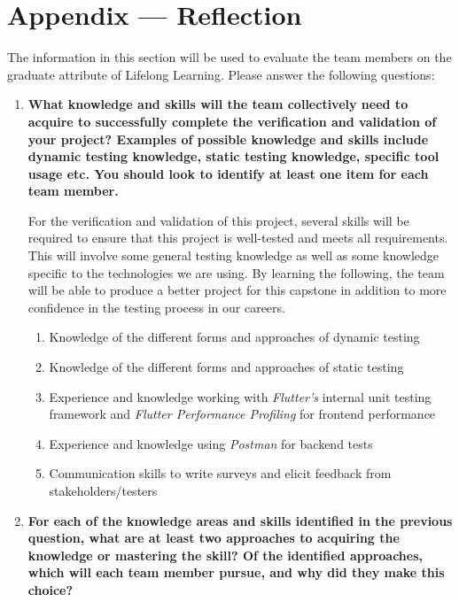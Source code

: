\documentclass[12pt, titlepage]{article}
\begin{document}
\newpage{}
\section*{Appendix --- Reflection}

The information in this section will be used to evaluate the team members on the
graduate attribute of Lifelong Learning.  Please answer the following questions:

\begin{enumerate}
  \item \textbf{What knowledge and skills will the team collectively need to acquire to
  successfully complete the verification and validation of your project?
  Examples of possible knowledge and skills include dynamic testing knowledge,
  static testing knowledge, specific tool usage etc.  You should look to
  identify at least one item for each team member.}

  For the verification and validation of this project, several skills will be required
  to ensure that this project is well-tested and meets all requirements. This will involve
  some general testing knowledge as well as some knowledge specific to the technologies we
  are using. By learning the following, the team will be able to produce a better project for this
  capstone in addition to more confidence in the testing process in our careers.
  \begin{enumerate}
    \item Knowledge of the different forms and approaches of dynamic testing
    \item Knowledge of the different forms and approaches of static testing
    \item Experience and knowledge working with \textit{Flutter's} internal unit testing framework and
    \textit{Flutter Performance Profiling} for frontend performance
    \item Experience and knowledge using \textit{Postman} for backend tests
    \item Communication skills to write surveys and elicit feedback from stakeholders/testers
  \end{enumerate}

  \item \textbf{For each of the knowledge areas and skills identified in the previous
  question, what are at least two approaches to acquiring the knowledge or
  mastering the skill?  Of the identified approaches, which will each team
  member pursue, and why did they make this choice?}


\end{enumerate}
\end{document}
